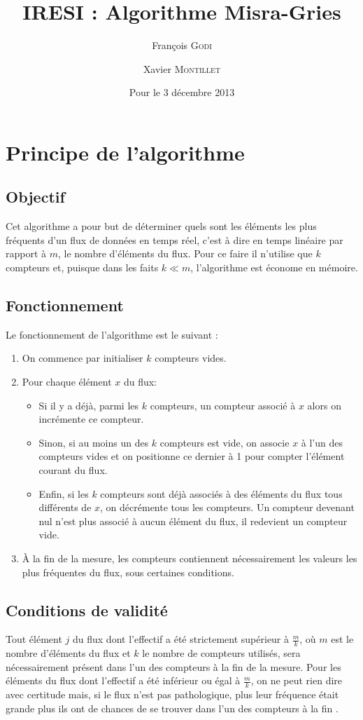 \documentclass{article}
\title{IRESI : Algorithme Misra-Gries}
\author{François \textsc{Godi} \and Xavier \textsc{Montillet}}
\date{Pour le 3 décembre 2013}
\begin{document}
	
\maketitle

\section{Principe de l'algorithme}

	\subsection{Objectif}	
		Cet algorithme a pour but de déterminer quels sont les éléments les plus fréquents d'un flux de données en temps 				réel, c'est à dire en temps linéaire par rapport à $m$, le nombre d'éléments du flux. Pour ce faire il n'utilise que 			$k$ compteurs et, puisque dans les faits $k \ll m$, l'algorithme est économe en mémoire.
	
	\subsection{Fonctionnement}	
		Le fonctionnement de l'algorithme est le suivant : 
		\begin{enumerate}
			\item On commence par initialiser $k$ compteurs vides.
			\item Pour chaque élément $x$ du flux: 
				\begin{itemize}
					\item Si il y a déjà, parmi les $k$ compteurs, un compteur associé à $x$ alors 	on incrémente ce 									compteur.
					\item Sinon, si au moins un des $k$ compteurs est vide, on associe $x$ à l'un des compteurs vides et on 							positionne ce dernier à 1 pour compter l'élément courant du flux.
					\item  Enfin, si les $k$ compteurs sont déjà associés à des éléments du flux tous différents de $x$, on 							décrémente tous les compteurs. Un compteur devenant nul n'est plus associé à aucun élément du flux, 							il redevient un compteur vide.
				\end{itemize}
			\item À la fin de la mesure, les compteurs contiennent nécessairement les valeurs les plus fréquentes du flux, 						sous certaines conditions.
		\end{enumerate}				
	
	\subsection{Conditions de validité}
		Tout élément $j$ du flux dont l'effectif a été strictement supérieur \`a $\frac{m}{k}$, où $m$ est le nombre d'éléments 			du 	flux et $k$ le nombre de compteurs utilisés, sera nécessairement présent dans l'un des compteurs à la fin de la 			mesure. Pour les éléments du flux dont l'effectif a été inférieur ou égal à $\frac{m}{k}$, on ne peut rien dire avec certitude 				mais, si le flux n'est pas pathologique, plus leur fréquence était grande plus ils ont de chances de se trouver dans 			l'un des compteurs à la fin .
	
\end{document}
